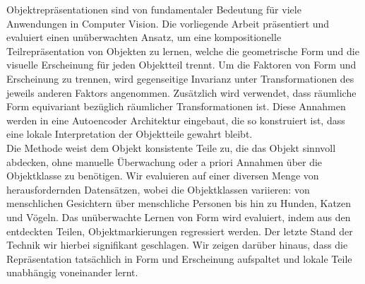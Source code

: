 Objektrepräsentationen sind von fundamentaler Bedeutung für viele Anwendungen in Computer Vision. Die vorliegende Arbeit präsentiert und evaluiert einen unüberwachten Ansatz, um eine kompositionelle Teilrepräsentation von Objekten zu lernen, welche die geometrische Form und die visuelle Erscheinung für jeden Objektteil trennt. Um die Faktoren von Form und Erscheinung zu trennen, wird gegenseitige Invarianz unter Transformationen des jeweils anderen Faktors angenommen. Zusätzlich wird verwendet, dass räumliche Form equivariant bezüglich räumlicher Transformationen ist. Diese Annahmen werden in eine Autoencoder Architektur eingebaut, die so konstruiert ist, dass eine lokale Interpretation der Objektteile gewahrt bleibt. \\
Die Methode weist dem Objekt konsistente Teile zu, die das Objekt sinnvoll abdecken, ohne manuelle Überwachung oder a priori Annahmen über die Objektklasse zu benötigen.
Wir evaluieren auf einer diversen Menge von herausfordernden Datensätzen, wobei die Objektklassen variieren: von menschlichen Gesichtern über menschliche Personen bis hin zu Hunden, Katzen und Vögeln. Das unüberwachte Lernen von Form wird evaluiert, indem aus den entdeckten Teilen, Objektmarkierungen regressiert werden. Der letzte Stand der Technik wir hierbei signifikant geschlagen. Wir zeigen darüber hinaus, dass die Repräsentation tatsächlich in Form und Erscheinung aufspaltet und lokale Teile unabhängig voneinander lernt.
